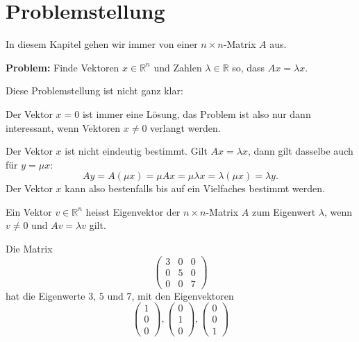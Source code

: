 \section{Problemstellung}
In diesem Kapitel gehen wir immer von einer $n\times n$-Matrix $A$ aus.

\medskip
{\parindent0pt \bf Problem:} Finde Vektoren $x\in\mathbb R^n$ und
Zahlen $\lambda\in\mathbb R$ so, dass $Ax=\lambda x$.
\medskip

{\parindent0pt Diese Problemstellung ist nicht ganz klar:}
\begin{compactitem}
\item Der Vektor $x=0$ ist immer eine Lösung, das Problem ist also
nur dann interessant, wenn Vektoren $x\ne 0$ verlangt werden.
\item Der Vektor $x$ ist nicht eindeutig bestimmt.
Gilt $Ax=\lambda x$, dann gilt dasselbe auch für $y=\mu x$:
\[
Ay= A(\mu x)=\mu Ax=\mu\lambda x = \lambda (\mu x)=\lambda y.
\]
Der Vektor $x$ kann also bestenfalls bis auf ein Vielfaches bestimmt werden.
\end{compactitem}

\begin{definition}
Ein Vektor $v \in \mathbb R^n$ heisst Eigenvektor der $n\times n$-Matrix $A$
zum Eigenwert $\lambda$, wenn $v\ne 0$ und $Av=\lambda v$ gilt.
\end{definition}

\begin{beispiel}
Die Matrix
\[
\begin{pmatrix}
3&0&0\\
0&5&0\\
0&0&7
\end{pmatrix}
\]
hat die Eigenwerte $3$, $5$ und $7$, mit den Eigenvektoren
\[
\begin{pmatrix}
1\\0\\0
\end{pmatrix}
,
\begin{pmatrix}
0\\1\\0
\end{pmatrix}
,
\begin{pmatrix}
0\\0\\1
\end{pmatrix}
\]
\end{beispiel}

